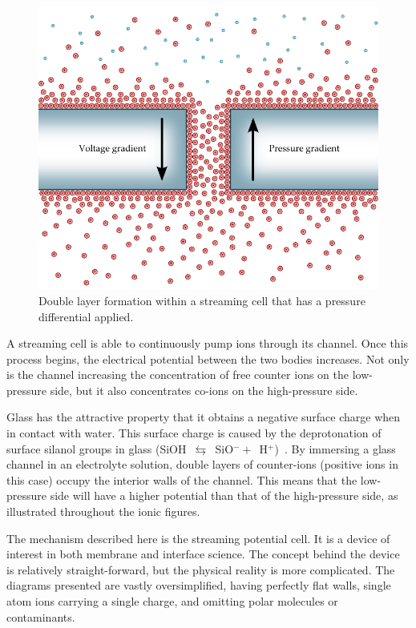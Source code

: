     \begin{figure}[ht]
        \centering
        \includegraphics{content/pt1/01-PowerHarvesting/graphics/intro_2_channel}
        \caption{\label{fig:doubleLayerInChannel_withPressure}Double layer formation within a streaming cell that has a pressure differential applied.}
    \end{figure}

    A streaming cell is able to continuously pump ions through its channel.
    Once this process begins, the electrical potential between the two bodies increases.
    Not only is the channel increasing the concentration of free counter ions on the low-pressure side, but it also concentrates co-ions on the high-pressure side.

    Glass has the attractive property that it obtains a negative surface charge when in contact with water.
    This surface charge is caused by the deprotonation of surface silanol groups in glass (SiOH~$\leftrightarrows$~SiO$^{-}+$~H$^{+}$)~\cite{Kirby2004}.
    By immersing a glass channel in an electrolyte solution, double layers of counter-ions (positive ions in this case) occupy the interior walls of the channel.
    This means that the low-pressure side will have a higher potential than that of the high-pressure side, as illustrated throughout the ionic figures.

    The mechanism described here is the streaming potential cell.
    It is a device of interest in both membrane and interface science.
    The concept behind the device is relatively straight-forward, but the physical reality is more complicated.
    The diagrams presented are vastly oversimplified, having perfectly flat walls, single atom ions carrying a single charge, and omitting polar molecules or contaminants.

